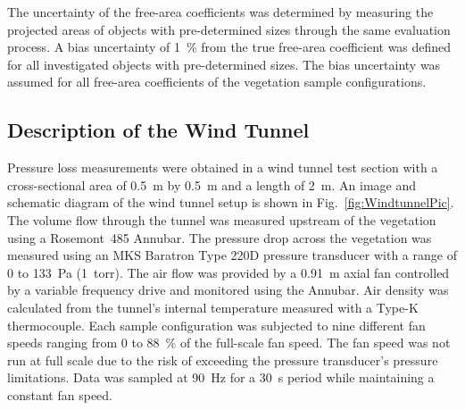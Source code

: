 \documentclass[12pt]{article}
\begin{document}
The uncertainty of the free-area coefficients was determined by measuring the projected areas of objects with pre-determined sizes through the same evaluation process. A bias uncertainty of 1~\% from the true free-area coefficient was defined for all investigated objects with pre-determined sizes. The bias uncertainty was assumed for all free-area coefficients of the vegetation sample configurations.

\subsection{Description of the Wind Tunnel}
\label{ssec:headingscap}

Pressure loss measurements were obtained in a wind tunnel test section with a cross-sectional area of 0.5~\si{m} by 0.5~\si{m} and a length of 2~\si{m}. An image and schematic diagram of the wind tunnel setup is shown in Fig.~\ref{fig:WindtunnelPic}. The volume flow through the tunnel was measured upstream of the vegetation using a Rosemont~485 Annubar. The pressure drop across the vegetation was measured using an MKS Baratron Type 220D pressure transducer with a range of 0 to 133~Pa (1~torr). The air flow was provided by a 0.91~m axial fan controlled by a variable frequency drive and monitored using the Annubar. Air density was calculated from the tunnel's internal temperature measured with a Type-K thermocouple. Each sample configuration was subjected to nine different fan speeds ranging from 0 to 88~\% of the full-scale fan speed. The fan speed was not run at full scale due to the risk of exceeding the pressure transducer's pressure limitations. Data was sampled at 90~\si{Hz} for a 30~\si{s} period while maintaining a constant fan speed.
\end{document}
